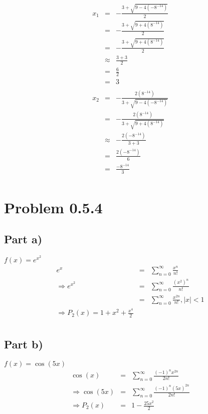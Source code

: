 \documentclass[12pt]{article}
\begin{document}
\begin{eqnarray*}
x_{1} & = & - \frac{3 + \sqrt{9 - 4(-8^{-14})}}{2}\\
& = & - \frac{3 + \sqrt{9 + 4(8^{-14})}}{2}\\
& = & - \frac{3 + \sqrt{9 + 4(8^{-14})}}{2}\\
& \approx & \frac{3 + 3}{2}\\
& = & \frac{6}{2}\\
& = & 3\\
\\
x_{2} & = & - \frac{2(8^{-14})}{3 + \sqrt{9 - 4(-8^{-14})}}\\
& = & - \frac{2(8^{-14})}{3 + \sqrt{9 + 4(8^{-14})}}\\
& \approx & - \frac{2(-8^{-14})}{3 + 3}\\
& = & \frac{2(-8^{-14})}{6}\\
& = & \frac{-8^{-14}}{3}\\
\end{eqnarray*}

\section*{Problem 0.5.4}
\subsection*{Part a)}
\(f(x) = e^{x^{2}}\)\\
\begin{eqnarray*}
e^{x} & = & \sum_{n=0}^{\infty} \frac{x^{n}}{n!}\\
\Rightarrow e^{x^{2}} & = & \sum_{n=0}^{\infty} \frac{(x^{2})^{n}}{n!}\\ 
& = & \sum_{n=0}^{\infty} \frac{x^{2n}}{n!}, \left|x\right| < 1\\ 
\Rightarrow P_{2}(x) = 1 + x^{2} + \frac{x^{4}}{2}\\
\end{eqnarray*}

\subsection*{Part b)}
\(f(x) = \cos(5x)\)
\begin{eqnarray*}
\cos(x) & = & \sum_{n=0}^{\infty} \frac{(-1)^{n}x^{2n}}{2n!}\\
\Rightarrow\cos(5x) & = & \sum_{n=0}^{\infty} \frac{(-1)^{n}(5x)^{2n}}{2n!}\\
\Rightarrow P_{2}(x) & = & 1 - \frac{25x^{2}}{2}\\
\end{eqnarray*}
\end{document}
